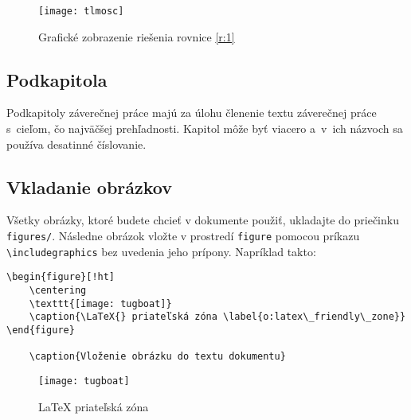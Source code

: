 \begin{figure}[ht!]
\centering
\texttt{[image: tlmosc]}
\caption{Grafické zobrazenie riešenia rovnice \ref{r:1}}\label{o:2}
\end{figure}



\subsection{Podkapitola}
Podkapitoly záverečnej práce majú za úlohu členenie textu záverečnej
práce s~cieľom, čo najväčšej prehľadnosti. Kapitol môže byť viacero
a~v~ich názvoch sa používa desatinné číslovanie.



\subsection{Vkladanie obrázkov}

Všetky obrázky, ktoré budete chcieť v dokumente použiť, ukladajte do priečinku {\tt figures/}. Následne obrázok vložte v prostredí \verb!figure! pomocou príkazu \verb!\includegraphics! bez uvedenia jeho prípony. Napríklad takto:

\begin{verbatim}
\begin{figure}[!ht]
	\centering
	\texttt{[image: tugboat]}
	\caption{\LaTeX{} priateľská zóna \label{o:latex\_friendly\_zone}}
\end{figure}

	\caption{Vloženie obrázku do textu dokumentu}
\end{verbatim}



\begin{figure}[!ht]
	\centering
	\texttt{[image: tugboat]}
	\caption{\LaTeX{} priateľská zóna \label{o:latex_friendly_zone}}
\end{figure}